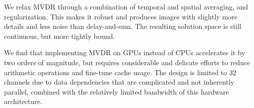 We relax MVDR through a combination of temporal and spatial averaging, and regularization. This makes it robust and produces images with slightly more details and less noise than delay-and-sum. The resulting solution space is still continuous, but more tightly bound.

We find that implementing MVDR on GPUs instead of CPUs accelerates it by two orders of magnitude, but requires considerable and delicate efforts to reduce arithmetic operations and fine-tune cache usage. The design is limited to 32 channels due to data dependencies that are complicated and not inherently parallel, combined with the relatively limited bandwidth of this hardware architecture. 


%

%




